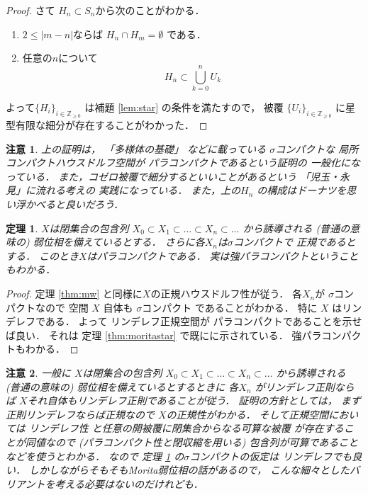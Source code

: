 \documentclass[leqno, a4paper, 12pt]{jsarticle}
\newtheorem{thm}{定理}
\newtheorem*{rmk}{注意}
\newcommand{\zz}{\mathbb{Z}}
\begin{document}
\begin{proof}
さて $H_{n}\subset S_{n}$から次のことがわかる．
\begin{enumerate}[label=\textup{(\arabic*)}]
\item $2\le |m-n|$ならば
$H_{n}\cap H_{m}=\emptyset$
である．
\item 
任意の$n$について
\[
H_{n}\subset \bigcup_{k=0}^{n}U_{k}
\]
\end{enumerate}
よって$\{H_{i}\}_{i\in \zz_{\ge 0}}$
は補題
\ref{lem:star}
の条件を満たすので，
被覆
$\{U_{i}\}_{i\in \zz_{\ge 0}}$
に星型有限な細分が存在することがわかった．
\end{proof}
\begin{rmk}
上の証明は，
「多様体の基礎」
などに載っている
$\sigma$コンパクトな
局所コンパクトハウスドルフ空間が
パラコンパクトであるという証明の
一般化になっている．
また，コゼロ被覆で細分するといいことがあるという
「児玉・永見」に流れる考えの
実践になっている．
また，上の$H_{n}$
の構成はドーナツを思い浮かべると良いだろう．
\end{rmk}

\begin{thm}\label{thm:parapara}
$X$は閉集合の包含列
$X_{0}\subset X_{1}\subset \dots \subset X_{n}\subset \dots$
から誘導される
(普通の意味の)
弱位相を備えているとする．
さらに各$X_{n}$は$\sigma$コンパクトで
正規であるとする．
このとき$X$はパラコンパクトである．
実は強パラコンパクトということもわかる．
\end{thm}

\begin{proof}
定理
\ref{thm:mw}
と同様に$X$の正規ハウスドルフ性が従う．
各$X_{n}$が
$\sigma$コンパクトなので
空間
$X$
自体も
$\sigma$コンパクト
であることがわかる．
特に
$X$
はリンデレフである．
よって
リンデレフ正規空間が
パラコンパクトであることを示せば良い．
それは
定理
\ref{thm:moritastar}
で既にに示されている．
強パラコンパクトもわかる．
\end{proof}

\begin{rmk}
一般に
$X$は閉集合の包含列
$X_{0}\subset X_{1}\subset \dots \subset X_{n}\subset \dots$
から誘導される
(普通の意味の)
弱位相を備えているとするときに
各$X_{n}$
がリンデレフ正則ならば
$X$それ自体もリンデレフ正則であることが従う．
証明の方針としては，
まず正則リンデレフならば正規なので
$X$の正規性がわかる．
そして正規空間においては
リンデレフ性
と任意の開被覆に閉集合からなる可算な被覆
が存在することが同値なので
(パラコンパクト性と閉収縮を用いる)
包含列が可算であることなどを使うとわかる．
なので
定理
\ref{thm:parapara}
の$\sigma$コンパクトの仮定は
リンデレフでも良い．
しかしながらそもそもMorita弱位相の話があるので，
こんな細々としたバリアントを考える必要はないのだけれども．
\end{rmk}
\end{document}
